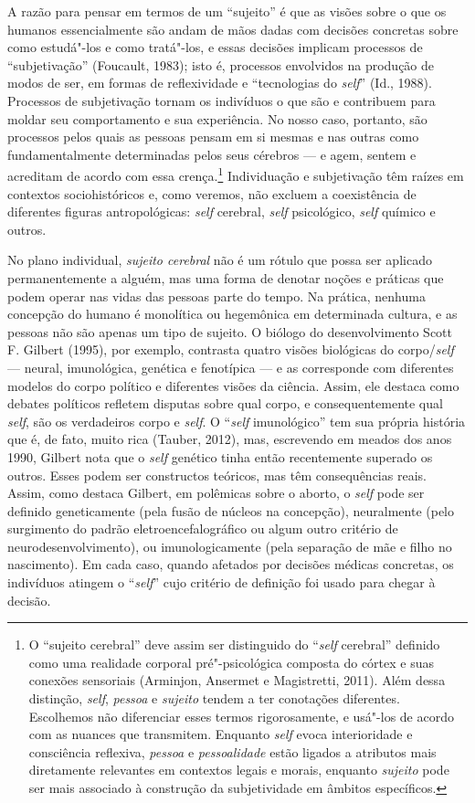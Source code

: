 A razão para pensar em termos de um ``sujeito'' é que as visões sobre o
que os humanos essencialmente são andam de mãos dadas com decisões
concretas sobre como estudá"-los e como tratá"-los, e essas decisões
implicam processos de ``subjetivação'' (Foucault, 1983);
isto é, processos
envolvidos na produção de modos de ser, em formas de reflexividade e
``tecnologias do \emph{self}'' (Id., 1988). Processos de subjetivação
tornam os indivíduos o que são e contribuem para moldar seu
comportamento e sua experiência. No nosso caso, portanto, são processos
pelos quais as pessoas pensam em si mesmas e nas outras como
fundamentalmente determinadas pelos seus cérebros --- e agem, sentem e
acreditam de acordo com essa crença.\footnote[4]{O ``sujeito cerebral'' deve assim ser distinguido do ``\emph{self}
cerebral'' definido como uma realidade corporal pré"-psicológica composta
do córtex e suas conexões sensoriais (Arminjon, Ansermet e Magistretti,
2011). Além dessa distinção, \emph{self}, \emph{pessoa} e \emph{sujeito}
tendem a ter conotações diferentes. Escolhemos não diferenciar esses
termos rigorosamente, e usá"-los de acordo com as nuances que transmitem.
Enquanto \emph{self} evoca interioridade e consciência reflexiva,
\emph{pessoa} e \emph{pessoalidade} estão ligados a atributos mais
diretamente relevantes em contextos legais e morais, enquanto
\emph{sujeito} pode ser mais associado à construção da subjetividade em
âmbitos específicos.} Individuação e
subjetivação têm raízes em contextos sociohistóricos e, como veremos,
não excluem a coexistência de diferentes figuras antropológicas: \emph{self}
cerebral, \emph{self} psicológico, \emph{self} químico e outros.

No plano individual, \emph{sujeito cerebral} não é um rótulo que possa
ser aplicado permanentemente a alguém, mas uma forma de denotar noções e
práticas que podem operar nas vidas das pessoas parte do tempo. Na
prática, nenhuma concepção do humano é monolítica ou hegemônica em
determinada cultura, e as pessoas não são apenas um tipo de sujeito. O
biólogo do desenvolvimento Scott F. Gilbert (1995), por exemplo,
contrasta quatro visões biológicas do corpo/\emph{self} --- neural,
imunológica, genética e fenotípica --- e as corresponde com diferentes
modelos do corpo político e diferentes visões da ciência. Assim, ele
destaca como debates políticos refletem disputas sobre qual corpo, e
consequentemente qual \emph{self}, são os verdadeiros corpo e \emph{self}. O ``\emph{self}
imunológico'' tem sua própria história que é, de fato, muito rica
(Tauber, 2012), mas, escrevendo em meados dos anos 1990, Gilbert nota
que o \emph{self} genético tinha então recentemente superado os outros. Esses podem
ser constructos teóricos, mas têm consequências reais. Assim, como
destaca Gilbert, em polêmicas sobre o aborto, o \emph{self} pode ser definido
geneticamente (pela fusão de núcleos na concepção), neuralmente (pelo
surgimento do padrão eletroencefalográfico ou algum outro critério de
neurodesenvolvimento), ou imunologicamente (pela separação de mãe e
filho no nascimento). Em cada caso, quando afetados por decisões médicas
concretas, os indivíduos atingem o ``\emph{self}'' cujo critério de definição
foi usado para chegar à decisão.

